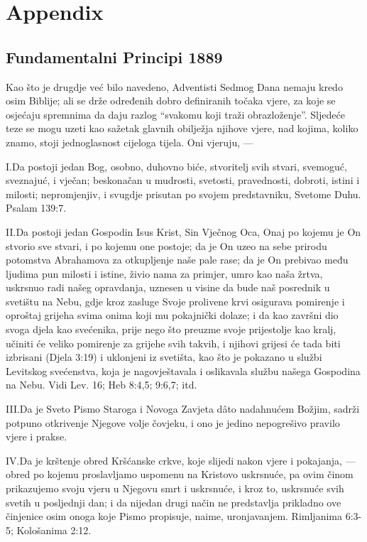 \chapter*{Appendix} \label{chap:appendix}

\section*{Fundamentalni Principi 1889}

Kao što je drugdje već bilo navedeno, Adventisti Sedmog Dana nemaju kredo osim Biblije; ali se drže određenih dobro definiranih točaka vjere, za koje se osjećaju spremnima da daju razlog “svakomu koji traži obrazloženje”. Sljedeće teze se mogu uzeti kao sažetak glavnih obilježja njihove vjere, nad kojima, koliko znamo, stoji jednoglasnost cijeloga tijela. Oni vjeruju, —

\lettrine{I.} Da postoji jedan Bog, osobno, duhovno biće, stvoritelj svih stvari, svemoguć, sveznajuć, i vječan; beskonačan u mudrosti, svetosti, pravednosti, dobroti, istini i milosti; nepromjenjiv, i svugdje prisutan po svojem predstavniku, Svetome Duhu. Psalam 139:7.

\lettrine{II.} Da postoji jedan Gospodin Isus Krist, Sin Vječnog Oca, Onaj po kojemu je On stvorio sve stvari, i po kojemu one postoje; da je On uzeo na sebe prirodu potomstva Abrahamova za otkupljenje naše pale rase; da je On prebivao među ljudima pun milosti i istine, živio nama za primjer, umro kao naša žrtva, uskrsnuo radi našeg opravdanja, uznesen u visine da bude naš posrednik u svetištu na Nebu, gdje kroz zasluge Svoje prolivene krvi osigurava pomirenje i oproštaj grijeha svima onima koji mu pokajnički dolaze; i da kao završni dio svoga djela kao svećenika, prije nego što preuzme svoje prijestolje kao kralj, učiniti će veliko pomirenje za grijehe svih takvih, i njihovi grijesi će tada biti izbrisani (Djela 3:19) i uklonjeni iz svetišta, kao što je pokazano u službi Levitskog svećenstva, koja je nagovještavala i oslikavala službu našega Gospodina na Nebu. Vidi Lev. 16; Heb 8:4,5; 9:6,7; itd.

\lettrine{III.} Da je Sveto Pismo Staroga i Novoga Zavjeta dâto nadahnućem Božjim, sadrži potpuno otkrivenje Njegove volje čovjeku, i ono je jedino nepogrešivo pravilo vjere i prakse.

\lettrine{IV.} Da je krštenje obred Kršćanske crkve, koje slijedi nakon vjere i pokajanja, — obred po kojemu proslavljamo uspomenu na Kristovo uskrsnuće, pa ovim činom prikazujemo svoju vjeru u Njegovu smrt i uskrsnuće, i kroz to, uskrsnuće svih svetih u posljednji dan; i da nijedan drugi način ne predstavlja prikladno ove činjenice osim onoga koje Pismo propisuje, naime, uronjavanjem. Rimljanima 6:3-5; Kološanima 2:12.

